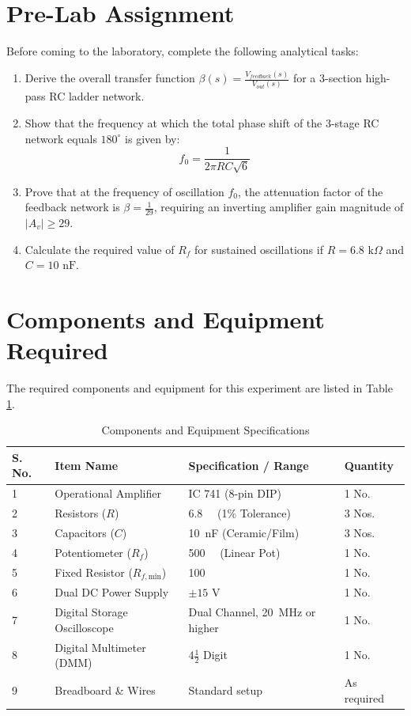 \section{Pre-Lab Assignment}
Before coming to the laboratory, complete the following analytical tasks:
\begin{enumerate}
	\item Derive the overall transfer function $\beta(s) = \frac{V_{feedback}(s)}{V_{out}(s)}$ for a 3-section high-pass RC ladder network.
	\item Show that the frequency at which the total phase shift of the 3-stage RC network equals $180^\circ$ is given by:
	\begin{equation}
		f_0 = \frac{1}{2\pi R C \sqrt{6}}
	\end{equation}
	\item Prove that at the frequency of oscillation $f_0$, the attenuation factor of the feedback network is $\beta = \frac{1}{29}$, requiring an inverting amplifier gain magnitude of $|A_v| \ge 29$.
	\item Calculate the required value of $R_f$ for sustained oscillations if $R = 6.8\text{ k}\Omega$ and $C = 10\text{ nF}$.
\end{enumerate}

\section{Components and Equipment Required}
The required components and equipment for this experiment are listed in Table \ref{tab:components_rc_osc}.

\begin{table}[h!]
	\centering
	\caption{Components and Equipment Specifications}
	\label{tab:components_rc_osc}
	\begin{tabular}{llll}
		\toprule
		\textbf{S. No.} & \textbf{Item Name} & \textbf{Specification / Range} & \textbf{Quantity} \\
		\midrule
		1 & Operational Amplifier & IC 741 (8-pin DIP) & 1 No. \\
		2 & Resistors ($R$) & \SI{6.8}{\kilo\Omega} (1\% Tolerance) & 3 Nos. \\
		3 & Capacitors ($C$) & \SI{10}{\nano\farad} (Ceramic/Film) & 3 Nos. \\
		4 & Potentiometer ($R_f$) & \SI{500}{\kilo\Omega} (Linear Pot) & 1 No. \\
		5 & Fixed Resistor ($R_{f,\text{min}}$) & \SI{100}{\kilo\Omega} & 1 No. \\
		6 & Dual DC Power Supply & $\pm 15\text{ V}$ & 1 No. \\
		7 & Digital Storage Oscilloscope & Dual Channel, \SI{20}{\mega\hertz} or higher & 1 No. \\
		8 & Digital Multimeter (DMM) & $4\frac{1}{2}$ Digit & 1 No. \\
		9 & Breadboard \& Wires & Standard setup & As required \\
		\bottomrule
	\end{tabular}
\end{table}

